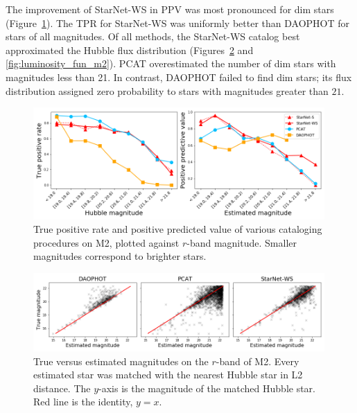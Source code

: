 

The improvement of StarNet-WS in PPV was most pronounced for dim stars (Figure~\ref{fig:summary_stats}). The TPR for StarNet-WS was uniformly better than DAOPHOT for stars of all magnitudes. 
Of all methods, the StarNet-WS catalog best approximated the Hubble flux distribution (Figures~\ref{fig:m2_flux_estimation} and \ref{fig:luminosity_fun_m2}). 
PCAT overestimated the number of dim stars with magnitudes less than 21. 
In contrast, DAOPHOT failed to find dim stars; its flux distribution assigned zero probability to stars with magnitudes greater than $21$.

\begin{figure}[ht]
    \centering
    \includegraphics[width=0.99\textwidth]{figures/summary_statistics_m2.png}
    \caption{True positive rate and positive predicted value of various cataloging
    procedures on M2, plotted against $r$-band magnitude.
    Smaller magnitudes correspond to brighter stars.
    }
    \label{fig:summary_stats}
\end{figure}

\begin{figure}[ht]
    \centering
    \includegraphics[width=0.99\textwidth]{figures/m2_flux_estimation.png}
    \caption{True versus estimated magnitudes on the $r$-band of M2. 
    Every estimated star was matched with the nearest Hubble star in L2 distance. The $y$-axis is the magnitude of the matched Hubble star. Red line is the identity, $y=x$. }
    \label{fig:m2_flux_estimation}
\end{figure}

